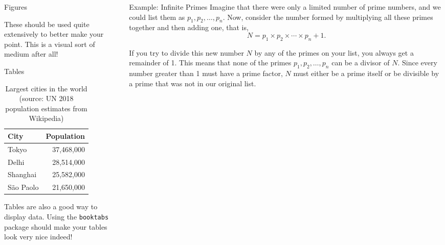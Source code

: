 \documentclass[final]{beamer}
\begin{document}
\begin{frame}[fragile]
\begin{columns}[t]
\begin{column}{0.3\paperwidth}
\begin{block}{Figures}
    \bigskip

    These should be used quite extensively to better make your point. This is
    a visual sort of medium after all!
\end{block}

\begin{block}{Tables}
    \begin{table}
    \centering
    \caption{Largest cities in the world (source: UN 2018 population estimates
    from Wikipedia)}
    \begin{tabular}{@{} lr @{}}
        \toprule
        City & Population\\
        \midrule
        Tokyo & 37,468,000 \\
        Delhi & 28,514,000 \\
        Shanghai & 25,582,000 \\
        São Paolo & 21,650,000 \\
        \bottomrule
    \end{tabular}
    \end{table}

    \bigskip

    Tables are also a good way to display data. Using the \texttt{booktabs}
    package should make your tables look very nice indeed!
\end{block}

\end{column}

\separatorcolumn

\begin{column}{0.3\paperwidth}

\begin{exampleblock}{Example: Infinite Primes}
    Imagine that there were only a limited number of prime numbers, and we could
    list them as \(p_1, p_2, \ldots, p_n\). Now, consider the number formed by
    multiplying all these primes together and then adding one, that is,
    \[
    N = p_1 \times p_2 \times \cdots \times p_n + 1.
    \]

    \bigskip

    If you try to divide this new number \(N\) by any of the primes on your list,
    you always get a remainder of 1. This means that none of the primes
    \(p_1, p_2, \ldots, p_n\) can be a divisor of \(N\). Since every number
    greater than 1 must have a prime factor, \(N\) must either be a prime
    itself or be divisible by a prime that was not in our original list.

    \bigskip


\end{exampleblock}
\end{column}
\end{columns}
\end{frame}
\end{document}
